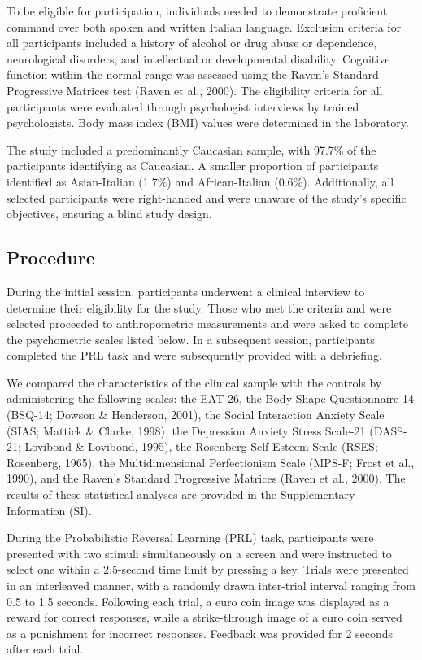 \documentclass[
  man,floatsintext]{apa6}
\begin{document}
To be eligible for participation, individuals needed to demonstrate proficient command over both spoken and written Italian language. Exclusion criteria for all participants included a history of alcohol or drug abuse or dependence, neurological disorders, and intellectual or developmental disability. Cognitive function within the normal range was assessed using the Raven's Standard Progressive Matrices test (Raven et al., 2000). The eligibility criteria for all participants were evaluated through psychologist interviews by trained psychologists. Body mass index (BMI) values were determined in the laboratory.

The study included a predominantly Caucasian sample, with 97.7\% of the participants identifying as Caucasian. A smaller proportion of participants identified as Asian-Italian (1.7\%) and African-Italian (0.6\%). Additionally, all selected participants were right-handed and were unaware of the study's specific objectives, ensuring a blind study design.

\hypertarget{procedure}{%
\subsection{Procedure}\label{procedure}}

During the initial session, participants underwent a clinical interview to determine their eligibility for the study. Those who met the criteria and were selected proceeded to anthropometric measurements and were asked to complete the psychometric scales listed below. In a subsequent session, participants completed the PRL task and were subsequently provided with a debriefing.

We compared the characteristics of the clinical sample with the controls by administering the following scales: the EAT-26, the Body Shape Questionnaire-14 (BSQ-14; Dowson \& Henderson, 2001), the Social Interaction Anxiety Scale (SIAS; Mattick \& Clarke, 1998), the Depression Anxiety Stress Scale-21 (DASS-21; Lovibond \& Lovibond, 1995), the Rosenberg Self-Esteem Scale (RSES; Rosenberg, 1965), the Multidimensional Perfectionism Scale (MPS-F; Frost et al., 1990), and the Raven's Standard Progressive Matrices (Raven et al., 2000). The results of these statistical analyses are provided in the Supplementary Information (SI).

During the Probabilistic Reversal Learning (PRL) task, participants were presented with two stimuli simultaneously on a screen and were instructed to select one within a 2.5-second time limit by pressing a key. Trials were presented in an interleaved manner, with a randomly drawn inter-trial interval ranging from 0.5 to 1.5 seconds. Following each trial, a euro coin image was displayed as a reward for correct responses, while a strike-through image of a euro coin served as a punishment for incorrect responses. Feedback was provided for 2 seconds after each trial.
\end{document}
